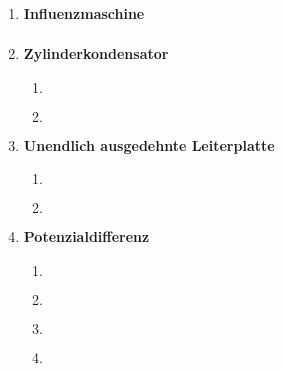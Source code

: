 \documentclass[11pt,letterpaper]{article}
\begin{document}
\begin{enumerate}
    
    \item \textbf{Influenzmaschine}
        \begin{align*}
        \end{align*}

    
    \item \textbf{Zylinderkondensator}
        \begin{enumerate}
            \item
            \begin{align*}
            \end{align*}

            \item
            \begin{align*}
            \end{align*}

        \end{enumerate}

    
    \item \textbf{Unendlich ausgedehnte Leiterplatte}
        \begin{enumerate}
            \item
            \begin{align*}
            \end{align*}

            \item
            \begin{align*}
            \end{align*}

        \end{enumerate}

    
    \item \textbf{Potenzialdifferenz}
        \begin{enumerate}
            \item
            \begin{align*}
            \end{align*}

            \item
            \begin{align*}
            \end{align*}

            \item
            \begin{align*}
            \end{align*}

            \item
            \begin{align*}
            \end{align*}


\end{enumerate}
\end{enumerate}
\end{document}
